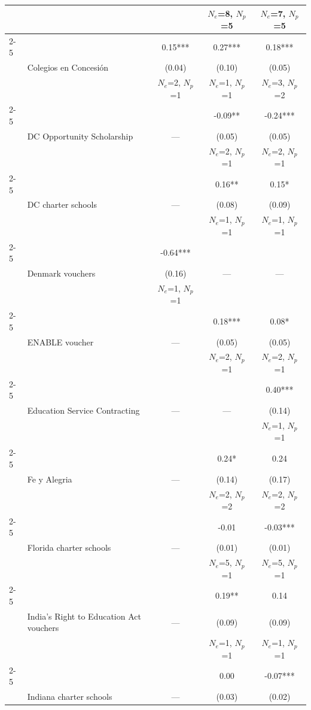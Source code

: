 \begin{longtable}{@{\extracolsep{\fill}} l l c c c @{}}
  &  &  & $N_e$=8, $N_p$=5 & $N_e$=7, $N_p$=5 \\
\cmidrule(lr){2-5}
  &  & 0.15*** & 0.27*** & 0.18*** \\
  & Colegios en Concesión & (0.04) & (0.10) & (0.05) \\
  &  & $N_e$=2, $N_p$=1 & $N_e$=1, $N_p$=1 & $N_e$=3, $N_p$=2 \\
\cmidrule(lr){2-5}
  &  &  & -0.09** & -0.24*** \\
  & DC Opportunity Scholarship & --- & (0.05) & (0.05) \\
  &  &  & $N_e$=2, $N_p$=1 & $N_e$=2, $N_p$=1 \\
\cmidrule(lr){2-5}
  &  &  & 0.16** & 0.15* \\
  & DC charter schools & --- & (0.08) & (0.09) \\
  &  &  & $N_e$=1, $N_p$=1 & $N_e$=1, $N_p$=1 \\
\cmidrule(lr){2-5}
  &  & -0.64*** &  &  \\
  & Denmark vouchers & (0.16) & --- & --- \\
  &  & $N_e$=1, $N_p$=1 &  &  \\
\cmidrule(lr){2-5}
  &  &  & 0.18*** & 0.08* \\
  & ENABLE voucher & --- & (0.05) & (0.05) \\
  &  &  & $N_e$=2, $N_p$=1 & $N_e$=2, $N_p$=1 \\
\cmidrule(lr){2-5}
  &  &  &  & 0.40*** \\
  & Education Service Contracting & --- & --- & (0.14) \\
  &  &  &  & $N_e$=1, $N_p$=1 \\
\cmidrule(lr){2-5}
  &  &  & 0.24* & 0.24 \\
  & Fe y Alegria & --- & (0.14) & (0.17) \\
  &  &  & $N_e$=2, $N_p$=2 & $N_e$=2, $N_p$=2 \\
\cmidrule(lr){2-5}
  &  &  & -0.01 & -0.03*** \\
  & Florida charter schools & --- & (0.01) & (0.01) \\
  &  &  & $N_e$=5, $N_p$=1 & $N_e$=5, $N_p$=1 \\
\cmidrule(lr){2-5}
  &  &  & 0.19** & 0.14 \\
  & India's Right to Education Act vouchers & --- & (0.09) & (0.09) \\
  &  &  & $N_e$=1, $N_p$=1 & $N_e$=1, $N_p$=1 \\
\cmidrule(lr){2-5}
  &  &  & 0.00 & -0.07*** \\
  & Indiana charter schools & --- & (0.03) & (0.02) \\

\end{longtable}
